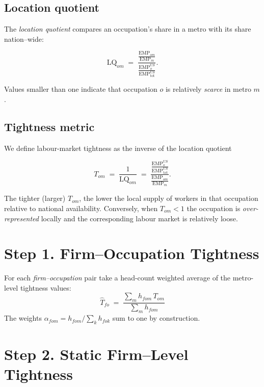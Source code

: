 \documentclass[11pt]{article}
\begin{document}
\subsection*{Location quotient}

The \emph{location quotient} compares an occupation's share in a metro
with its share nation–wide:

\begin{equation}
  \text{LQ}_{om}\;=\;\frac{\displaystyle\frac{\text{EMP}_{om}}{\text{EMP}_{m}}}
                          {\displaystyle\frac{\text{EMP}^{US}_{o}}{\text{EMP}^{US}_{\text{tot}}}}.
\end{equation}

Values smaller than one indicate that occupation $o$ is relatively
\emph{scarce} in metro $m$.

\subsection*{Tightness metric}

We define labour-market tightness as the inverse of the location quotient

\begin{equation}
  T_{om} \;=\; \frac{1}{\text{LQ}_{om}} \;=\;
  \frac{\displaystyle \frac{\text{EMP}^{US}_{o}}{\text{EMP}^{US}_{\text{tot}}}}
       {\displaystyle \frac{\text{EMP}_{om}}{\text{EMP}_{m}}}.
  \label{eq:tight_oews}
\end{equation}

The tighter (larger) $T_{om}$, the lower the local supply of workers in
that occupation relative to national availability.  Conversely, when
$T_{om}<1$ the occupation is 
\emph{over\hyp{}represented} locally and the corresponding labour market is
relatively loose.

\section{Step 1.\; Firm--Occupation Tightness}

For each \emph{firm--occupation} pair take a head-count weighted average of the metro-level tightness values:
\begin{equation}
  \widehat{T}_{fo} \;=\; \frac{\displaystyle\sum_{m} h_{fom}\, T_{om}}{\displaystyle\sum_{m} h_{fom}}
  \label{eq:focc}
\end{equation}
The weights
\(
  \alpha_{fom}=h_{fom}/\!\sum_k h_{fok}
\)
sum to one by construction.

\section{Step 2.\; Static Firm--Level Tightness}
\end{document}
